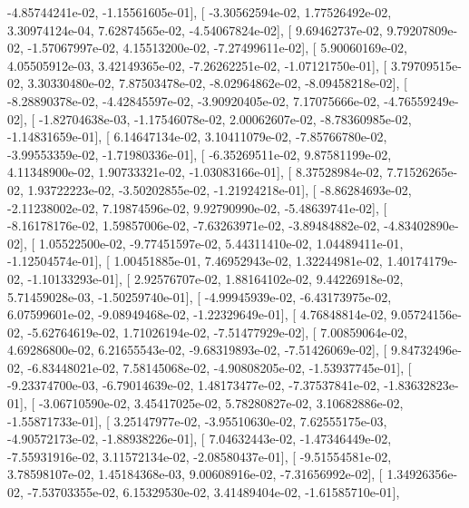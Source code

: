 \documentclass{article}
\begin{document}
         -4.85744241e-02,  -1.15561605e-01],
       [ -3.30562594e-02,   1.77526492e-02,   3.30974124e-04,
          7.62874565e-02,  -4.54067824e-02],
       [  9.69462737e-02,   9.79207809e-02,  -1.57067997e-02,
          4.15513200e-02,  -7.27499611e-02],
       [  5.90060169e-02,   4.05505912e-03,   3.42149365e-02,
         -7.26262251e-02,  -1.07121750e-01],
       [  3.79709515e-02,   3.30330480e-02,   7.87503478e-02,
         -8.02964862e-02,  -8.09458218e-02],
       [ -8.28890378e-02,  -4.42845597e-02,  -3.90920405e-02,
          7.17075666e-02,  -4.76559249e-02],
       [ -1.82704638e-03,  -1.17546078e-02,   2.00062607e-02,
         -8.78360985e-02,  -1.14831659e-01],
       [  6.14647134e-02,   3.10411079e-02,  -7.85766780e-02,
         -3.99553359e-02,  -1.71980336e-01],
       [ -6.35269511e-02,   9.87581199e-02,   4.11348900e-02,
          1.90733321e-02,  -1.03083166e-01],
       [  8.37528984e-02,   7.71526265e-02,   1.93722223e-02,
         -3.50202855e-02,  -1.21924218e-01],
       [ -8.86284693e-02,  -2.11238002e-02,   7.19874596e-02,
          9.92790990e-02,  -5.48639741e-02],
       [ -8.16178176e-02,   1.59857006e-02,  -7.63263971e-02,
         -3.89484882e-02,  -4.83402890e-02],
       [  1.05522500e-02,  -9.77451597e-02,   5.44311410e-02,
          1.04489411e-01,  -1.12504574e-01],
       [  1.00451885e-01,   7.46952943e-02,   1.32244981e-02,
          1.40174179e-02,  -1.10133293e-01],
       [  2.92576707e-02,   1.88164102e-02,   9.44226918e-02,
          5.71459028e-03,  -1.50259740e-01],
       [ -4.99945939e-02,  -6.43173975e-02,   6.07599601e-02,
         -9.08949468e-02,  -1.22329649e-01],
       [  4.76848814e-02,   9.05724156e-02,  -5.62764619e-02,
          1.71026194e-02,  -7.51477929e-02],
       [  7.00859064e-02,   4.69286800e-02,   6.21655543e-02,
         -9.68319893e-02,  -7.51426069e-02],
       [  9.84732496e-02,  -6.83448021e-02,   7.58145068e-02,
         -4.90808205e-02,  -1.53937745e-01],
       [ -9.23374700e-03,  -6.79014639e-02,   1.48173477e-02,
         -7.37537841e-02,  -1.83632823e-01],
       [ -3.06710590e-02,   3.45417025e-02,   5.78280827e-02,
          3.10682886e-02,  -1.55871733e-01],
       [  3.25147977e-02,  -3.95510630e-02,   7.62555175e-03,
         -4.90572173e-02,  -1.88938226e-01],
       [  7.04632443e-02,  -1.47346449e-02,  -7.55931916e-02,
          3.11572134e-02,  -2.08580437e-01],
       [ -9.51554581e-02,   3.78598107e-02,   1.45184368e-03,
          9.00608916e-02,  -7.31656992e-02],
       [  1.34926356e-02,  -7.53703355e-02,   6.15329530e-02,
          3.41489404e-02,  -1.61585710e-01],
\end{document}
